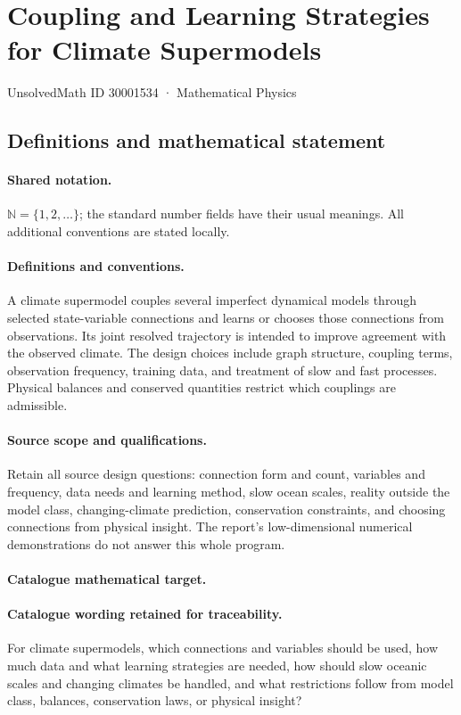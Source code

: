 \documentclass[11pt]{article}
\begin{document}
\setcounter{section}{30001533}
\section{Coupling and Learning Strategies for Climate Supermodels}\label{30001534}
{\small UnsolvedMath ID 30001534 · Mathematical Physics}
\subsection{Definitions and mathematical statement}

\paragraph{Shared notation.}$\mathbb N=\{1,2,\ldots\}$; the standard number fields have their usual meanings. All additional conventions are stated locally.


\paragraph{Definitions and conventions.} A climate supermodel couples several imperfect dynamical models through selected state-variable connections and learns or chooses those connections from observations. Its joint resolved trajectory is intended to improve agreement with the observed climate. The design choices include graph structure, coupling terms, observation frequency, training data, and treatment of slow and fast processes. Physical balances and conserved quantities restrict which couplings are admissible.

\paragraph{Source scope and qualifications.} Retain all source design questions: connection form and count, variables and frequency, data needs and learning method, slow ocean scales, reality outside the model class, changing-climate prediction, conservation constraints, and choosing connections from physical insight. The report's low-dimensional numerical demonstrations do not answer this whole program.

\paragraph{Catalogue mathematical target.}
\paragraph{Catalogue wording retained for traceability.}
For climate supermodels, which connections and variables should be used, how much data and what learning strategies are needed, how should slow oceanic scales and changing climates be handled, and what restrictions follow from model class, balances, conservation laws, or physical insight?
\end{document}
